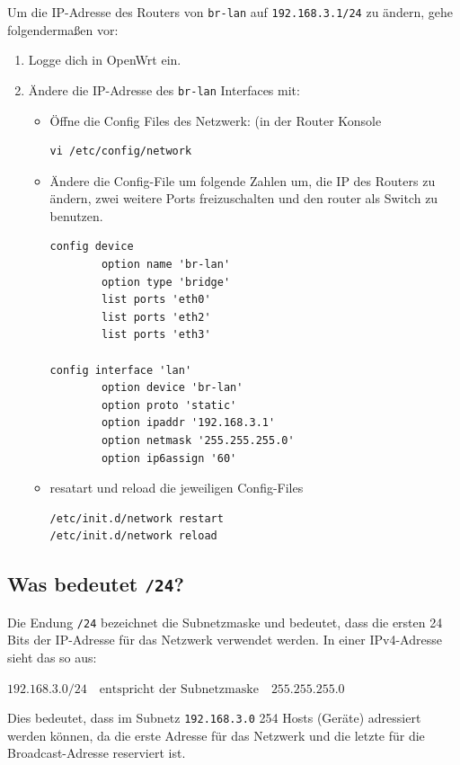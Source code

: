 \documentclass[12pt, a4paper]{article}\usepackage{listings}
\begin{document}
Um die IP-Adresse des Routers von \texttt{br-lan} auf \texttt{192.168.3.1/24} zu ändern, gehe folgendermaßen vor:

\begin{enumerate}
    \item Logge dich in OpenWrt ein.
    \item Ändere die IP-Adresse des \texttt{br-lan} Interfaces mit:
    \begin{itemize}
    \item Öffne die Config Files des Netzwerk: (in der Router Konsole
    \begin{verbatim}
vi /etc/config/network
    \end{verbatim}
    \item Ändere die Config-File um folgende Zahlen um, die IP des Routers zu ändern, zwei weitere Ports freizuschalten und den router als Switch zu benutzen.
        \begin{verbatim}
config device
        option name 'br-lan'
        option type 'bridge'
        list ports 'eth0'
        list ports 'eth2'
        list ports 'eth3'

config interface 'lan'
        option device 'br-lan'
        option proto 'static'
        option ipaddr '192.168.3.1'
        option netmask '255.255.255.0'
        option ip6assign '60'
    \end{verbatim}
    \item resatart und reload die jeweiligen Config-Files
\begin{verbatim}
/etc/init.d/network restart
/etc/init.d/network reload
\end{verbatim}
    \end{itemize}
\end{enumerate}

\newpage

\subsection{Was bedeutet \texttt{/24}?}

Die Endung \texttt{/24} bezeichnet die Subnetzmaske und bedeutet, dass die ersten 24 Bits der IP-Adresse für das Netzwerk verwendet werden. In einer IPv4-Adresse sieht das so aus:

$
192.168.3.0/24 \quad \text{entspricht der Subnetzmaske} \quad 255.255.255.0
$

Dies bedeutet, dass im Subnetz \texttt{192.168.3.0} 254 Hosts (Geräte) adressiert werden können, da die erste Adresse für das Netzwerk und die letzte für die Broadcast-Adresse reserviert ist.
\end{document}
